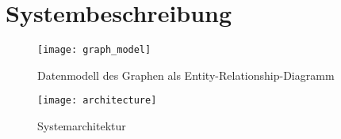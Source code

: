 \chapter{Systembeschreibung}

\begin{figure}
\label{fig:graph_model}
\begin{center}
    \texttt{[image: graph\_model]}
\end{center}
\caption{Datenmodell des Graphen als Entity-Relationship-Diagramm}
\end{figure}

\begin{figure}
\label{fig:architecture}
\begin{center}
    \texttt{[image: architecture]}
\end{center}
\caption{Systemarchitektur}
\end{figure}